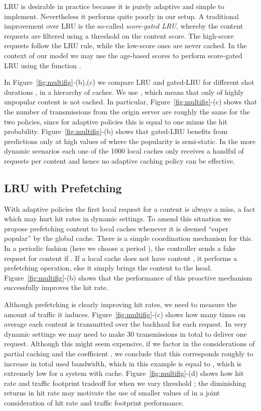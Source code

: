 \documentclass[10pt, conference, letterpaper]{IEEEtran}
\begin{document}
LRU is desirable in practice because it is purely adaptive
and simple to implement. 
Nevertheless it performs quite poorly in our setup. A traditional improvement over LRU is the so-called \emph{score-gated LRU}, whereby the content requests are filtered using a threshold on the content score. The high-score requests follow the LRU rule, while the low-score ones are never cached. 
In the context of our model we may use the age-based scores   to  
perform score-gated LRU using the function . 

In Figure~\ref{fig:multifig}-(b),(c) we compare LRU and gated-LRU for different shot durations , in a hierarchy of  caches. 
We use , which means that only  of highly unpopular content is not cached.
In particular, Figure~\ref{fig:multifig}-(c) shows that the number of transmissions from the origin server are roughly the same for the two policies, since for adaptive policies this is equal to one minus the hit probability.
Figure~\ref{fig:multifig}-(b) shows that gated-LRU benefits from predictions only at high values of  where the popularity is semi-static. In the more dynamic scenarios each one of the 1000 local caches only receives a handful of requests per content and hence no adaptive caching policy can be effective.

\subsection{LRU with Prefetching}

With adaptive policies the first local request for a content is always a miss, a fact which may hurt hit rates in dynamic settings. 
To amend this situation we propose prefetching content to local caches whenever it is deemed ``super popular'' by the global cache.
There is a simple coordination mechanism for this.
In a periodic fashion (here we choose a period ), the controller sends a fake request for content  if . If a local cache does not have content , it performs a prefetching operation, else it simply brings the content to the head.
Figure~\ref{fig:multifig}-(b) shows that the performance of this proactive mechanism successfully improves the hit rate.
	
	Although prefetching is clearly improving hit rates, 
	we need to measure the amount of traffic it induces.
Figure~\ref{fig:multifig}-(c) shows how many times on average each content is transmitted over the backhaul for each request.
In very dynamic settings we may need to make 30 transmissions in total to deliver one request. Although this might seem expensive, if we factor in the considerations of partial caching and the coefficient , we conclude that this corresponds roughly to  increase in total used bandwidth, which in this example is equal to , which is extremely low for a system with  cache. 
Figure~\ref{fig:multifig}-(d) shows how hit rate and traffic footprint tradeoff for  when we vary threshold ; the diminishing returns in hit rate may motivate the use of smaller values of  in a joint consideration of hit rate and traffic footprint performance.
 
\end{document}

